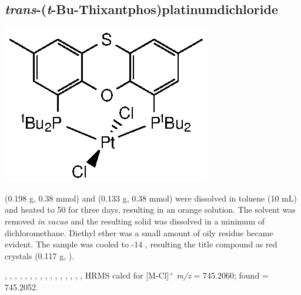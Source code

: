 \subsection*{\emph{trans}-(\emph{t}-Bu-Thixantphos)platinumdichloride}
\begin{structure}[h]
\begin{center}
\includegraphics{../Structures/StBuPtCl2.eps}
\end{center}
\end{structure}

\tBuThixantphos (0.198 g, 0.38 mmol) and \ce{[Pt(hex)Cl2]} (0.133 g, 0.38 mmol) were dissolved in toluene (10 mL) and heated to 50 \degC for three days, resulting in an orange solution.  The solvent was removed \emph{in vacuo} and the resulting solid was dissolved in a minimum of dichloromethane.  Diethyl ether was a small amount of oily residue became evident.  The sample was cooled to -14 \degC, resulting the title compound as red crystals (0.117 g, \fixme{\%}).

,
,
,
,
,
,
,
,
,
,
,
,
,
,
,
,
HRMS calcd for  [M-Cl]$^+$ \emph{m/z} = 745.2060; found = 745.2052.


